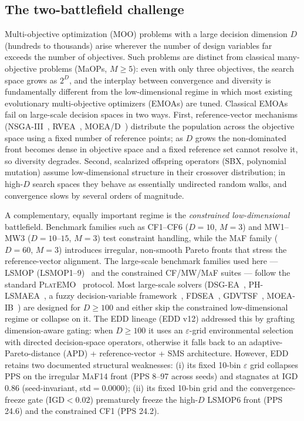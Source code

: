 \documentclass[preprint,12pt]{elsarticle}
\begin{document}
\subsection{The two-battlefield challenge}

Multi-objective optimization (MOO) problems with a large decision dimension
$D$ (hundreds to thousands) arise wherever the number of design variables far
exceeds the number of objectives. Such problems are distinct from classical
many-objective problems (MaOPs, $M\ge 5$): even with only three objectives,
the search space grows as $2^D$, and the interplay between convergence and
diversity is fundamentally different from the low-dimensional regime in which
most existing evolutionary multi-objective optimizers (EMOAs) are tuned.
Classical EMOAs fail on large-scale decision spaces in two ways. First,
reference-vector mechanisms (NSGA-III~\cite{deb2014an}, RVEA~\cite{cheng2016a},
MOEA/D~\cite{qingfuzhang2007moead}) distribute the population across the
objective space using a fixed number of reference points; as $D$ grows the
non-dominated front becomes dense in objective space and a fixed reference
set cannot resolve it, so diversity degrades. Second, scalarized offspring
operators (SBX, polynomial mutation) assume low-dimensional structure in
their crossover distribution; in high-$D$ search spaces they behave as
essentially undirected random walks, and convergence slows by several orders
of magnitude.

A complementary, equally important regime is the
\emph{constrained low-dimensional} battlefield. Benchmark families such
as \textsc{CF1}--\textsc{CF6} ($D=10$, $M=3$) and \textsc{MW1}--\textsc{MW3}
($D=10$--$15$, $M=3$) test constraint handling, while the
\textsc{MaF} family ($D=60$, $M=3$) introduces irregular, non-smooth
Pareto fronts that stress the reference-vector alignment. The
large-scale benchmark families used here ---
\textsc{LSMOP} (LSMOP1--9)~\cite{cheng2017test} and the constrained
\textsc{CF}/\textsc{MW}/\textsc{MaF} suites --- follow the standard
\textsc{PlatEMO}~\cite{chen2014platemo} protocol. Most large-scale
solvers (DSG-EA~\cite{zou2024two},
PH-LSMAEA~\cite{wang2024population},
a fuzzy decision-variable
framework~\cite{yang2023fuzzy},
FDSEA~\cite{fdsea2024},
GDVTSF~\cite{gdvtsf2025},
MOEA-IB~\cite{moeaib2025})
are designed for $D\ge 100$ and either skip the constrained low-dimensional
regime or collapse on it. The \textsc{EDD} lineage (EDD v12) addressed this
by grafting dimension-aware gating: when $D\ge 100$ it uses an
$\varepsilon$-grid environmental selection with directed decision-space
operators, otherwise it falls back to an adaptive-Pareto-distance
(\textsc{APD}) + reference-vector + \textsc{SMS} architecture. However, EDD
retains two documented structural weaknesses: (i) its fixed 10-bin
$\varepsilon$ grid collapses PPS on the irregular \textsc{MaF14} front
(PPS 8--97 across seeds) and stagnates at IGD 0.86 (seed-invariant,
std$=0.0000$); (ii) its fixed 10-bin grid and the convergence-freeze gate
($\mathrm{IGD}<0.02$) prematurely freeze the high-$D$ \textsc{LSMOP6}
front (PPS 24.6) and the constrained \textsc{CF1} (PPS 24.2).
\end{document}
